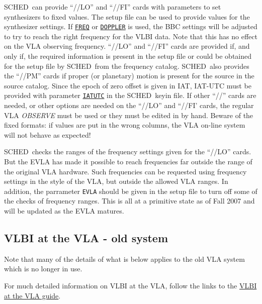 \documentclass{report}
\newcommand{\schedb}{{\sc SCHED~}}
\begin{document}
\schedb can provide ``//LO'' and ``//FI'' cards with parameters to set
synthesizers to fixed values. The setup file can be used to provide
values for the synthesizer settings. If 
{\hyperref[MP:FREQ]{{\tt FREQ}}}
or 
{\hyperref[MP:DOPPLER]{{\tt DOPPLER}}} is used, the BBC settings will
be adjusted to try to reach the right frequency for the VLBI
data. Note that this has no effect on the VLA observing
frequency. ``//LO'' and ``//FI'' cards are provided if, and only if,
the required information is present in the setup file or could be
obtained for the setup file by \schedb from the frequency catalog.
\schedb also provides the ``//PM'' cards if proper (or planetary)
motion is present for the source in the source catalog. Since the
epoch of zero offset is given in IAT, IAT-UTC must be provided with
parameter 
{\hyperref[MP:IATUTC]{{\tt IATUTC}}} in the \schedb keyin
file. If other ``//'' cards are needed, or other options are needed on
the ``//LO'' and ``//FI' cards, the regular VLA {\sl OBSERVE} must be
used or they must be edited in by hand. Beware of the fixed formats:
if values are put in the wrong columns, the VLA on-line system will
not behave as expected!

\schedb checks the ranges of the frequency settings given for the
``//LO'' cards.  But the EVLA has made it possible to reach
frequencies far outside the range of the original VLA hardware.  Such
frequencies can be requested using frequency settings in the style of
the VLA, but outside the allowed VLA ranges.  In addition, the
parrameter {\tt EVLA} should be given in the setup
file to turn off some of the checks of frequency ranges.  This is all
at a primitive state as of Fall 2007 and will be updated as the EVLA
matures.

\subsection{\label{SSEC:VLAVLBIOLD}VLBI at the VLA - old system}

Note that many of the details of what is below applies to the old VLA
system which is no longer in use.  

For much detailed information on VLBI at the VLA, follow the links to
the 
{\href{http://www.vla.nrao.edu/astro/guides/vlbivla/current/}{VLBI at the VLA guide}}.
\end{document}
